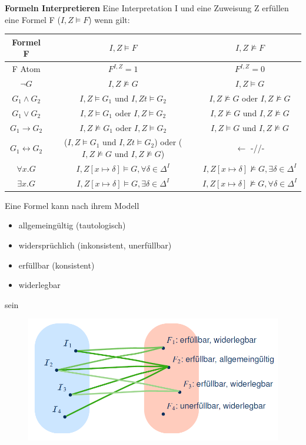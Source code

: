 \documentclass[12pt,a4paper]{article}
\begin{document}
\textbf{Formeln Interpretieren}
Eine Interpretation I und eine Zuweisung Z erfüllen eine Formel F ($I,Z \models F$) wenn gilt: 
\begin{tabular}{|c|c|c|}
\hline
Formel F & $I,Z \models F$ & $I,Z \not\models F$\\
\hline
F Atom & $F^{I,Z} = 1 $ & $ F^{I,Z} = 0$\\
\hline 
$\neg G$ & $I,Z \not\models G$ & $I,Z \models G$\\
\hline
$G_1 \land G_2$ & $I,Z \models G_1$ und $I,Z t\models G_2$ & $I,Z \not\models G$ oder $I,Z \not\models G$\\
\hline 
$G_1 \lor G_2$ & $I,Z \models G_1$ oder $I,Z \models G_2$ & $I,Z \not\models G$ und $I,Z \not\models G$\\
\hline 
$G_1 \rightarrow G_2$ & $I,Z \not\models G_1$ oder $I,Z \models G_2$ & $I,Z \models G$ und $I,Z \not\models G$\\
\hline 
$G_1 \leftrightarrow G_2$ & ($I,Z \models G_1$ und $I,Z t\models G_2$) oder ($I,Z \not\models G$ und $I,Z \not\models G$) & $\leftarrow$ -//- \\
\hline 
$\forall x.G$ & $I,Z[x\mapsto \delta] \models G, \forall \delta \in \Delta^I$ & $I,Z[x\mapsto \delta] \not\models G, \exists \delta \in \Delta^I$\\
\hline 
$\exists x.G$ & $I,Z[x\mapsto \delta] \models G, \exists \delta \in \Delta^I$ & $I,Z[x\mapsto \delta] \not\models G, \forall \delta \in \Delta^I$\\
\hline 
\end{tabular}

Eine Formel kann nach ihrem Modell
\begin{itemize}
\item allgemeingültig (tautologisch)
\item widersprüchlich (inkonsistent, unerfüllbar)
\item erfüllbar (konsistent)
\item widerlegbar
\end{itemize}
sein

\begin{figure}[H]
\includegraphics[scale=0.5]{./resources/model_types.png}
\end{figure}
\end{document}
